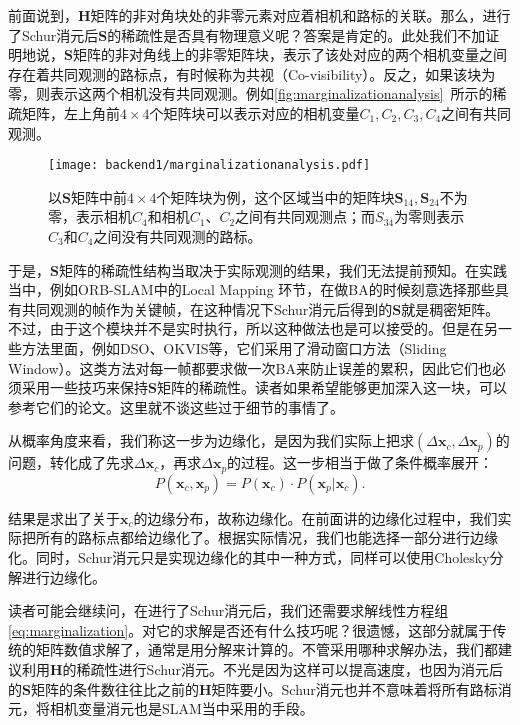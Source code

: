 前面说到，$\bm{H}$矩阵的非对角块处的非零元素对应着相机和路标的关联。那么，进行了Schur消元后$\bm{S}$的稀疏性是否具有物理意义呢？答案是肯定的。此处我们不加证明地说，$\bm{S}$矩阵的非对角线上的非零矩阵块，表示了该处对应的两个相机变量之间存在着共同观测的路标点，有时候称为共视（Co-visibility）。反之，如果该块为零，则表示这两个相机没有共同观测。例如\autoref{fig:marginalizationanalysis}~所示的稀疏矩阵，左上角前$4 \times 4$个矩阵块可以表示对应的相机变量$C_1,C_2,C_3,C_4$之间有共同观测。

\begin{figure}[!htp]
	\centering
	\texttt{[image: backend1/marginalizationanalysis.pdf]}
	\caption{以$\bm{S}$矩阵中前$4 \times 4$个矩阵块为例，这个区域当中的矩阵块$\bm{S}_{14}, \bm{S}_{24}$不为零，表示相机$C_4$和相机$C_1$、$C_2$之间有共同观测点；而$S_{34}$为零则表示$C_3$和$C_4$之间没有共同观测的路标。}
	\label{fig:marginalizationanalysis}
\end{figure}
\clearpage
于是，$\bm{S}$矩阵的稀疏性结构当取决于实际观测的结果，我们无法提前预知。在实践当中，例如ORB-SLAM\textsuperscript{\cite{Mur-Artal2015}}中的Local Mapping 环节，在做BA的时候刻意选择那些具有共同观测的帧作为关键帧，在这种情况下Schur消元后得到的$\bm{S}$就是稠密矩阵。不过，由于这个模块并不是实时执行，所以这种做法也是可以接受的。但是在另一些方法里面，例如DSO\textsuperscript{\cite{Engel2016}}、OKVIS\textsuperscript{\cite{Leutenegger2015}}等，它们采用了滑动窗口方法（Sliding Window）。这类方法对每一帧都要求做一次BA来防止误差的累积，因此它们也必须采用一些技巧来保持$\bm{S}$矩阵的稀疏性。读者如果希望能够更加深入这一块，可以参考它们的论文。这里就不谈这些过于细节的事情了。

从概率角度来看，我们称这一步为边缘化，是因为我们实际上把求$(\Delta \bm{x}_c, \Delta \bm{x}_p)$的问题，转化成了先求$\Delta \bm{x}_c$，再求$\Delta \bm{x}_p$的过程。这一步相当于做了条件概率展开：
\begin{equation}
P( \bm{x}_c, \bm{x}_p ) = P( \bm{x}_c ) \cdot P(\bm{x}_p | \bm{x}_c ).
\end{equation}

结果是求出了关于$\bm{x}_c$的边缘分布，故称边缘化。在前面讲的边缘化过程中，我们实际把所有的路标点都给边缘化了。根据实际情况，我们也能选择一部分进行边缘化。同时，Schur消元只是实现边缘化的其中一种方式，同样可以使用Cholesky分解进行边缘化。

读者可能会继续问，在进行了Schur消元后，我们还需要求解线性方程组\eqref{eq:marginalization}。对它的求解是否还有什么技巧呢？很遗憾，这部分就属于传统的矩阵数值求解了，通常是用分解来计算的。不管采用哪种求解办法，我们都建议利用$\bm{H}$的稀疏性进行Schur消元。不光是因为这样可以提高速度，也因为消元后的$\bm{S}$矩阵的条件数往往比之前的$\bm{H}$矩阵要小。Schur消元也并不意味着将所有路标消元，将相机变量消元也是SLAM当中采用的手段。

